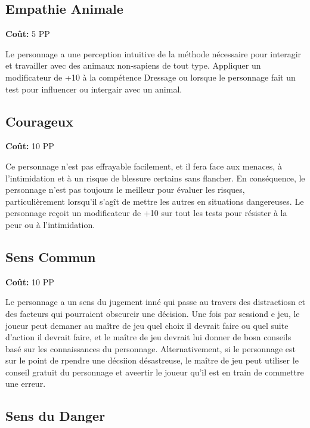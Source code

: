 \subsection{Empathie Animale} \label{sec:traits-animal-empathy} 

\textbf{Coût:} 5 PP 

Le personnage a une perception intuitive de la méthode nécessaire pour interagir et travailler avec des animaux non-sapiens de tout type. Appliquer un modificateur de +10 à la compétence Dressage ou lorsque le personnage fait un test pour influencer ou intergair avec un animal. 

\subsection{Courageux} \label{sec:traits-brave} 

\textbf{Coût:} 10 PP 

Ce personnage n'est pas effrayable facilement, et il fera face aux menaces, à l'intimidation et à un risque de blessure certains sans flancher. En conséquence, le personnage n'est pas toujours le meilleur pour évaluer les risques, particulièrement lorsqu'il s'agît de mettre les autres en situations dangereuses. Le personnage reçoit un modificateur de +10 sur tout les tests pour résister à la peur ou à l'intimidation. 

\subsection{Sens Commun} \label{sec:traits-common-sense} 

\textbf{Coût:} 10 PP 

Le personnage a un sens du jugement inné qui passe au travers des distractiosn et des facteurs qui pourraient obscurcir une décision. Une fois par sessiond e jeu, le joueur peut demaner au maître de jeu quel choix il devrait faire ou quel suite d'action il devrait faire, et le maître de jeu devrait lui donner de bosn conseils basé sur les connaissances du personnage. Alternativement, si le personnage est sur le point de rpendre une décsiion désastreuse, le maître de jeu peut utiliser le conseil gratuit du personnage et aveertir le joueur qu'il est en train de commettre une erreur. 

\subsection{Sens du Danger} \label{sec:traits-danger-sense} 

